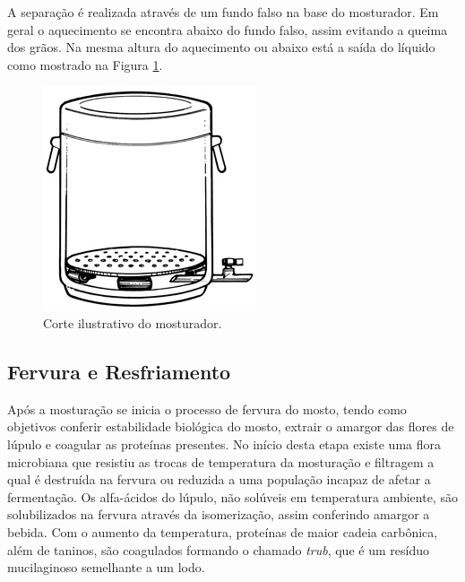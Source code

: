 A separação é realizada através de um fundo falso na base do mosturador. Em geral o aquecimento se encontra abaixo do fundo falso, assim evitando a queima dos grãos. Na mesma altura do aquecimento ou abaixo está a saída do líquido como mostrado na Figura \ref{filtracao}.

\begin{figure}[htb]
	\caption{\label{filtracao} Corte ilustrativo do mosturador.}
	\begin{center}
	    \includegraphics[width=0.55\linewidth]{./img/FalseBottom.jpg}
	\end{center}
\end{figure}


				\subsection{Fervura e Resfriamento}
Após a mosturação se inicia o processo de fervura do mosto, tendo como objetivos conferir estabilidade biológica do mosto, extrair o amargor das flores de lúpulo e coagular as proteínas presentes. No início desta etapa existe uma flora microbiana que resistiu as trocas de temperatura da mosturação e filtragem a qual é destruída na fervura ou reduzida a uma população incapaz de afetar a fermentação. Os alfa-ácidos do lúpulo, não solúveis em temperatura ambiente, são solubilizados na fervura através da isomerização, assim conferindo amargor a bebida. Com o aumento da temperatura, proteínas de maior cadeia carbônica, além de taninos, são coagulados formando o chamado \emph{trub}, que é um resíduo mucilaginoso semelhante a um lodo.

